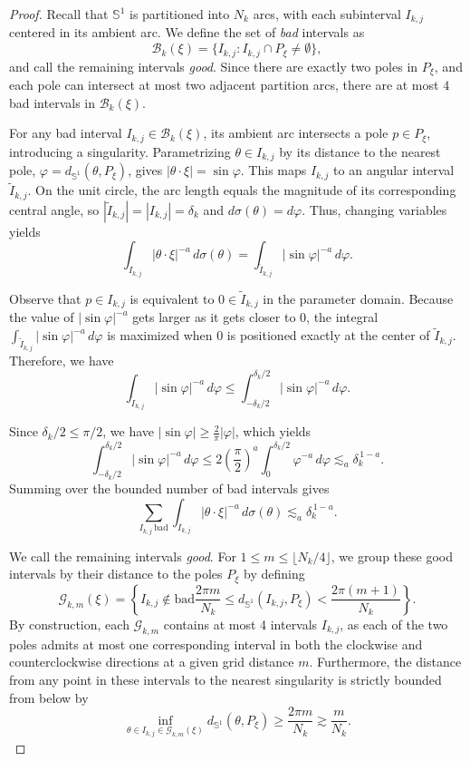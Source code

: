 \documentclass[10pt,a4paper]{amsart}
\begin{document}
\begin{proof}
	Recall that $\mathbb{S}^1$ is partitioned into $N_k$ arcs, with each subinterval $I_{k,j}$ centered in its ambient arc. We define the set of \emph{bad} intervals as
	$$ \mathcal{B}_k(\xi) = \{ I_{k,j}:I_{k,j} \cap P_\xi \neq \emptyset \}, $$
	and call the remaining intervals \emph{good}. Since there are exactly two poles in $P_\xi$, and each pole can intersect at most two adjacent partition arcs, there are at most $4$ bad intervals in $\mathcal{B}_k(\xi)$.
	
	For any bad interval $I_{k,j} \in \mathcal{B}_k(\xi)$, its ambient arc intersects a pole $p \in P_\xi$, introducing a singularity. Parametrizing $\theta \in I_{k,j}$ by its distance to the nearest pole, $\varphi = d_{\mathbb{S}^1}(\theta, P_\xi)$, gives $|\theta \cdot \xi| = \sin \varphi$. This maps $I_{k,j}$ to an angular interval $\widetilde{I}_{k,j}$. On the unit circle, the arc length equals the magnitude of its corresponding central angle, so $|\widetilde{I}_{k,j}| = |I_{k,j}| = \delta_k$ and $d\sigma(\theta) = d\varphi$. Thus, changing variables yields
	$$ \int_{I_{k,j}} |\theta \cdot \xi|^{-a} \, d\sigma(\theta) = \int_{\widetilde{I}_{k,j}} |\sin \varphi|^{-a} \, d\varphi. $$
	
	Observe that $p \in I_{k,j}$ is equivalent to $0 \in \widetilde{I}_{k,j}$ in the parameter domain. Because the value of $|\sin \varphi|^{-a}$ gets larger as it gets closer to $0$, the integral $\int_{\widetilde{I}_{k,j}} |\sin \varphi|^{-a} \, d\varphi$ is maximized when $0$ is positioned exactly at the center of $\widetilde{I}_{k,j}$. Therefore, we have
	$$\int_{\widetilde{I}_{k,j}} |\sin \varphi|^{-a} \, d\varphi \le \int_{-\delta_k/2}^{\delta_k/2} |\sin \varphi|^{-a} \, d\varphi.$$
	
	Since $\delta_k/2 \le \pi/2$, we have $|\sin \varphi| \ge \frac{2}{\pi} |\varphi|$, which yields
	$$ \int_{-\delta_k/2}^{\delta_k/2} |\sin \varphi|^{-a} \, d\varphi \le 2 \left(\frac{\pi}{2}\right)^a \int_0^{\delta_k/2} \varphi^{-a} \, d\varphi \lesssim_a \delta_k^{\,1-a}. $$
	Summing over the bounded number of bad intervals gives
	$$ \sum_{I_{k,j} \, \text{bad}} \int_{I_{k,j}} |\theta \cdot \xi|^{-a} \, d\sigma(\theta) \lesssim_a \delta_k^{\,1-a}.$$
	
	We call the remaining intervals \emph{good}. For $1 \le m \le \lfloor N_k/4 \rfloor$, we group these good intervals by their distance to the poles $P_\xi$ by defining
	$$ \mathcal{G}_{k,m}(\xi) = \left\{ I_{k,j} \notin \text{bad}  \frac{2\pi m}{N_k} \le d_{\mathbb{S}^1}(I_{k,j}, P_\xi) < \frac{2\pi (m+1)}{N_k} \right\}. $$
	By construction, each $\mathcal{G}_{k,m}$ contains at most 4 intervals $I_{k,j}$, as each of the two poles admits at most one corresponding interval in both the clockwise and counterclockwise directions at a given grid distance $m$. Furthermore, the distance from any point in these intervals to the nearest singularity is strictly bounded from below by
	$$ \inf_{\theta \in I_{k,j} \in \mathcal{G}_{k,m}(\xi)} d_{\mathbb{S}^1}(\theta, P_\xi) \ge \frac{2\pi m}{N_k} \gtrsim \frac{m}{N_k}. $$
	

\end{proof}
\end{document}

